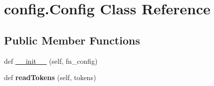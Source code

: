 \hypertarget{classconfig_1_1Config}{}\section{config.\+Config Class Reference}
\label{classconfig_1_1Config}
\subsection*{Public Member Functions}
\begin{DoxyCompactItemize}
\item 
def \hyperlink{classconfig_1_1Config_af3842cb4106df69ea7c24e198b696c2a}{\+\_\+\+\_\+init\+\_\+\+\_\+} (self, fn\+\_\+config)
\item 
def {\bfseries read\+Tokens} (self, tokens)\hypertarget{classconfig_1_1Config_af687a5593c380cc7adeb1743cae33e00}{}\label{classconfig_1_1Config_af687a5593c380cc7adeb1743cae33e00}

\end{DoxyCompactItemize}
